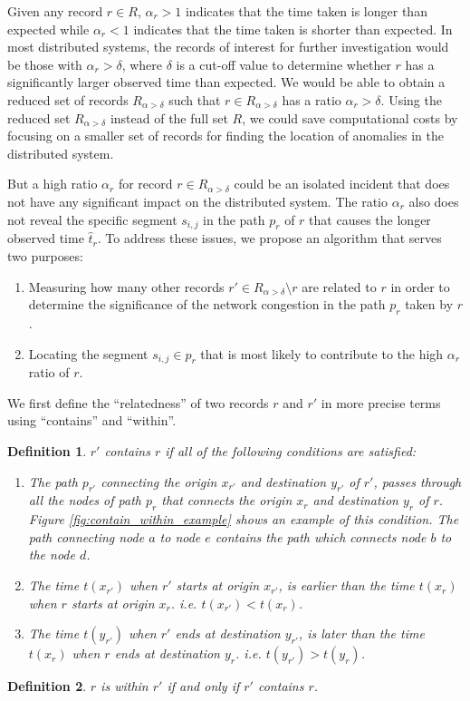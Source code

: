 \documentclass[conference]{IEEEtran.1.8}
\newtheorem{definition}{Definition}
\begin{document}
Given any record $r \in R$, $\alpha_r > 1$ indicates that the time taken is longer than expected while $\alpha_r < 1$ indicates that the time taken is shorter than expected. In most distributed systems, the records of interest for further investigation would be those with $\alpha_r > \delta$, where $\delta$ is a cut-off value to determine whether $r$ has a significantly larger observed time than expected. We would be able to obtain a reduced set of records $R_{\alpha > \delta}$ such that $r \in R_{\alpha > \delta}$ has a ratio $\alpha_r > \delta$. Using the reduced set $R_{\alpha > \delta}$ instead of the full set $R$, we could save computational costs by focusing on a smaller set of records for finding the location of anomalies in the distributed system.

But a high ratio $\alpha_r$ for record $r \in R_{\alpha > \delta}$ could be an isolated incident that does not have any significant impact on the distributed system. The ratio $\alpha_r$ also does not reveal the specific segment $s_{i,j}$ in the path $p_r$ of $r$ that causes the longer observed time $\hat{t}_r$. To address these issues, we propose an algorithm that serves two purposes:
\begin{enumerate}
	\item Measuring how many other records $r' \in R_{\alpha > \delta}\setminus{r}$ are related to $r$ in order to determine the significance of the network congestion in the path $p_r$ taken by $r$.
	\item Locating the segment $s_{i,j} \in p_r$ that is most likely to contribute to the high $\alpha_r$ ratio of $r$.
\end{enumerate}
We first define the ``relatedness'' of two records $r$ and $r'$ in more precise terms using ``contains'' and ``within''.
\begin{definition}
	$r'$ \emph{contains} $r$ if all of the following conditions are satisfied: 
	\begin{enumerate}
		\item The path $p_{r'}$ connecting the origin $x_{r'}$ and destination $y_{r'}$ of $r'$, passes through all the nodes of path $p_{r}$ that connects the origin $x_{r}$ and destination $y_{r}$ of $r$. Figure \ref{fig:contain_within_example} shows an example of this condition. The path connecting node $a$ to node $e$ contains the path which connects node $b$ to the node $d$.
		\item The time $t(x_{r'})$ when $r'$ starts at origin $x_{r'}$, is earlier than the time $t(x_{r})$ when $r$ starts at origin $x_{r}$. i.e. $t(x_{r'}) < t(x_{r})$.
		\item The time $t(y_{r'})$ when $r'$ ends at destination $y_{r'}$, is later than the time $t(x_{r})$ when $r$ ends at destination $y_{r}$. i.e. $t(y_{r'}) > t(y_{r})$.
	\end{enumerate}
\end{definition}
\begin{definition}
	$r$ is \emph{within} $r'$ if and only if $r'$ contains $r$.
\end{definition}
\end{document}
